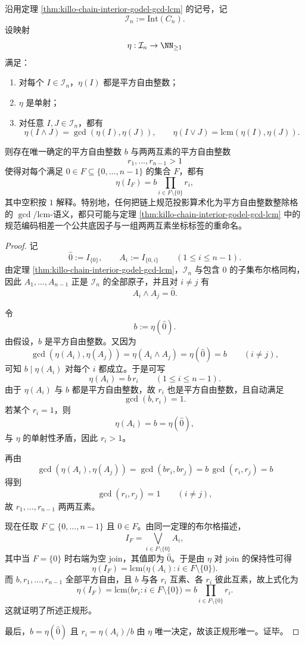 \begin{theorem}\label{thm:xi-chain-interior-squarefree-gcd-lcm-normalform}
沿用定理 \ref{thm:killo-chain-interior-godel-gcd-lcm} 的记号，记
\[
\mathcal I_n:=\mathrm{Int}(C_n).
\]
设映射
\[
\eta:\mathcal I_n\to \NN_{\ge 1}
\]
满足：
\begin{enumerate}
  \item 对每个 \(I\in\mathcal I_n\)，\(\eta(I)\) 都是平方自由整数；
  \item \(\eta\) 是单射；
  \item 对任意 \(I,J\in\mathcal I_n\)，都有
  \[
  \eta(I\wedge J)=\gcd(\eta(I),\eta(J)),
  \qquad
  \eta(I\vee J)=\mathrm{lcm}(\eta(I),\eta(J)).
  \]
\end{enumerate}
则存在唯一确定的平方自由整数 \(b\) 与两两互素的平方自由整数
\[
r_1,\dots,r_{n-1}>1
\]
使得对每个满足 \(0\in F\subseteq\{0,\dots,n-1\}\) 的集合 \(F\)，都有
\[
\boxed{\;
\eta(I_F)=b\prod_{i\in F\setminus\{0\}}r_i,
\;}
\]
其中空积按 \(1\) 解释。特别地，任何把链上规范投影算术化为平方自由整数整除格的 \(\gcd/\mathrm{lcm}\)-语义，都只可能与定理 \ref{thm:killo-chain-interior-godel-gcd-lcm} 中的规范编码相差一个公共底因子与一组两两互素坐标标签的重命名。
\end{theorem}
\begin{proof}
记
\[
\widehat 0:=I_{\{0\}},
\qquad
A_i:=I_{\{0,i\}}
\qquad (1\le i\le n-1).
\]
由定理 \ref{thm:killo-chain-interior-godel-gcd-lcm}，\(\mathcal I_n\) 与包含 \(0\) 的子集布尔格同构，因此 \(A_1,\dots,A_{n-1}\) 正是 \(\mathcal I_n\) 的全部原子，并且对 \(i\neq j\) 有
\[
A_i\wedge A_j=\widehat 0.
\]

令
\[
b:=\eta(\widehat 0).
\]
由假设，\(b\) 是平方自由整数。又因为
\[
\gcd(\eta(A_i),\eta(A_j))
=
\eta(A_i\wedge A_j)
=
\eta(\widehat 0)
=
b
\qquad(i\neq j),
\]
可知 \(b\mid \eta(A_i)\) 对每个 \(i\) 都成立。于是可写
\[
\eta(A_i)=b\,r_i
\qquad (1\le i\le n-1).
\]
由于 \(\eta(A_i)\) 与 \(b\) 都是平方自由整数，故 \(r_i\) 也是平方自由整数，且自动满足
\[
\gcd(b,r_i)=1.
\]
若某个 \(r_i=1\)，则
\[
\eta(A_i)=b=\eta(\widehat 0),
\]
与 \(\eta\) 的单射性矛盾，因此 \(r_i>1\)。

再由
\[
\gcd(\eta(A_i),\eta(A_j))
=
\gcd(br_i,br_j)
=
b\,\gcd(r_i,r_j)
=
b
\]
得到
\[
\gcd(r_i,r_j)=1
\qquad(i\neq j),
\]
故 \(r_1,\dots,r_{n-1}\) 两两互素。

现在任取 \(F\subseteq\{0,\dots,n-1\}\) 且 \(0\in F\)。由同一定理的布尔格描述，
\[
I_F=\bigvee_{i\in F\setminus\{0\}}A_i,
\]
其中当 \(F=\{0\}\) 时右端为空 join，其值即为 \(\widehat 0\)。于是由 \(\eta\) 对 join 的保持性可得
\[
\eta(I_F)
=
\mathrm{lcm}\bigl(\eta(A_i):i\in F\setminus\{0\}\bigr).
\]
而 \(b,r_1,\dots,r_{n-1}\) 全部平方自由，且 \(b\) 与各 \(r_i\) 互素、各 \(r_i\) 彼此互素，故上式化为
\[
\eta(I_F)
=
\mathrm{lcm}\bigl(br_i:i\in F\setminus\{0\}\bigr)
=
b\prod_{i\in F\setminus\{0\}}r_i.
\]
这就证明了所述正规形。

最后，\(b=\eta(\widehat 0)\) 且 \(r_i=\eta(A_i)/b\) 由 \(\eta\) 唯一决定，故该正规形唯一。证毕。
\end{proof}

